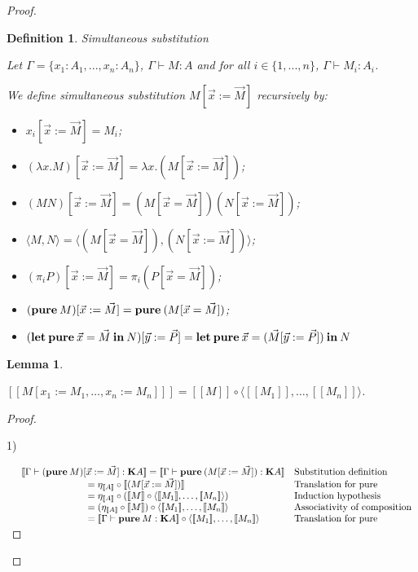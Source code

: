 \documentclass[a4paper]{article}
\newtheorem{lemma}{Lemma}
\newtheorem{defin}{Definition}
\begin{document}
\begin{proof}
\begin{defin} Simultaneous substitution

Let $\Gamma = \{ x_1 : A_1, ..., x_n : A_n \}$, $\Gamma \vdash M : A$ and for all $i \in \{ 1,..., n \}$,
$\Gamma \vdash M_i : A_i$.

We define simultaneous substitution $M [ \vec{x} := \vec{M}]$ recursively by:

\begin{itemize}
\item $x_i [ \vec{x} := \vec{M}] = M_i $;
\item $(\lambda x. M) [ \vec{x} := \vec{M}] = \lambda x. (M [ \vec{x} := \vec{M}])$;
\item $(M N) [ \vec{x} := \vec{M}] = (M [ \vec{x} = \vec{M}]) (N [ \vec{x} := \vec{M}])$;
\item $\langle M, N \rangle = \langle (M [ \vec{x} = \vec{M}]), (N [ \vec{x} := \vec{M}])\rangle$;
\item $(\pi_i P) [ \vec{x} := \vec{M}] = \pi_i (P [ \vec{x} = \vec{M}])$;
\item $({\bf pure \:} M) [ \vec{x} := \vec{M}] = {\bf pure \:} (M [ \vec{x} = \vec{M}])$;
\item $({\bf let \: pure} \: \vec{x} = \vec{M} {\: \bf in \:} N) [\vec{y} := \vec{P}] =
{\bf let \: pure} \: \vec{x} = (\vec{M} [\vec{y} := \vec{P}]) {\: \bf in \:} N$
\end{itemize}
\end{defin}

\begin{lemma}
$ $

$[\![M [x_1 := M_1,\dots, x_n := M_n]]\!] = [\![M]\!] \circ \langle [\![M_1]\!], \dots, [\![M_n]\!] \rangle$.

\end{lemma}

\begin{proof}

$ $

1)

$\begin{array}{lll}
& [\![\Gamma \vdash ({\bf pure \:} M) [ \vec{x} := \vec{M}] : {\bf K}A]\!] = [\![ \Gamma \vdash {\bf pure \:} (M [ \vec{x} := \vec{M}]) : {\bf K}A]\!] &
\text{Substitution definition} \\
& \quad\quad\quad\quad\quad\quad\quad = \eta_{[\![A]\!]} \circ [\![(M [ \vec{x} := \vec{M}])]\!]&
\text{Translation for pure}\\
& \quad\quad\quad\quad\quad\quad\quad = \eta_{[\![A]\!]} \circ ([\![M]\!] \circ \langle [\![M_1]\!], \dots,
[\![M_n]\!] \rangle) & \text{Induction hypothesis} \\
& \quad\quad\quad\quad\quad\quad\quad = (\eta_{[\![A]\!]} \circ [\![M]\!]) \circ \langle [\![M_1]\!], \dots,
[\![M_n]\!] \rangle & \text{Associativity of composition}\\
& \quad\quad\quad\quad\quad\quad\quad = [\![ \Gamma \vdash {\bf pure \:} M : {\bf K}A]\!] \circ \langle [\![M_1]\!], \dots,
[\![M_n]\!] \rangle& \text{Translation for pure}\\
\end{array}$


\end{proof}
\end{proof}
\end{document}

